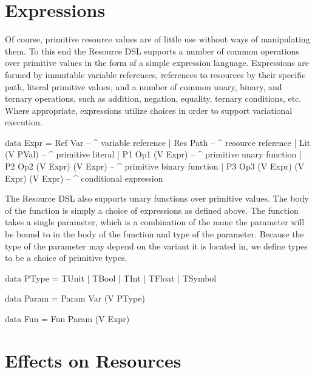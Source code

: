 \documentclass[12pt,oneside]{book}
\begin{document}
\section{Expressions}

Of course, primitive resource values are of little use without ways of manipulating them. To this end the Resource DSL supports
a number of common operations over primitive values in the form of a simple expression language. Expressions are formed by
immutable variable references, references to resources by their specific path, literal primitive values, and a number of common unary, binary, and ternary
operations, such as addition, negation, equality, ternary conditions, etc. Where appropriate, expressions utilize choices in order to support
variational execution.

\begin{program}
data Expr
     = Ref Var                             -- ^ variable reference
     | Res Path                            -- ^ resource reference
     | Lit (V PVal)                        -- ^ primitive literal
     | P1  Op1 (V Expr)                    -- ^ primitive unary function
     | P2  Op2 (V Expr) (V Expr)           -- ^ primitive binary function
     | P3 Op3 (V Expr) (V Expr) (V Expr) -- ^ conditional expression
\end{program}

The Resource DSL also supports unary functions over primitive values. The body of the function is simply a choice of expressions as defined above.
The function takes a single parameter, which is a combination of the name the parameter will be bound to in the body of the function and type of the parameter. Because the
type of the parameter may depend on the variant it is located in, we define types to be a choice of primitive types.

\begin{program}
data PType = TUnit | TBool | TInt | TFloat | TSymbol

data Param = Param Var (V PType)

data Fun = Fun Param (V Expr)
\end{program}

\section{Effects on Resources}
\end{document}
